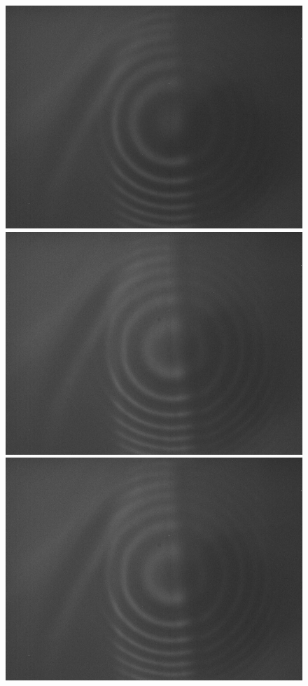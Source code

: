 \documentclass{article}
\begin{document}
\begin{figure}[H]
    \includegraphics[scale = 0.1]{3.jpg}
    \includegraphics[scale = 0.1]{4.jpg}
    \includegraphics[scale = 0.1]{5.jpg}

\end{figure}
\end{document}
